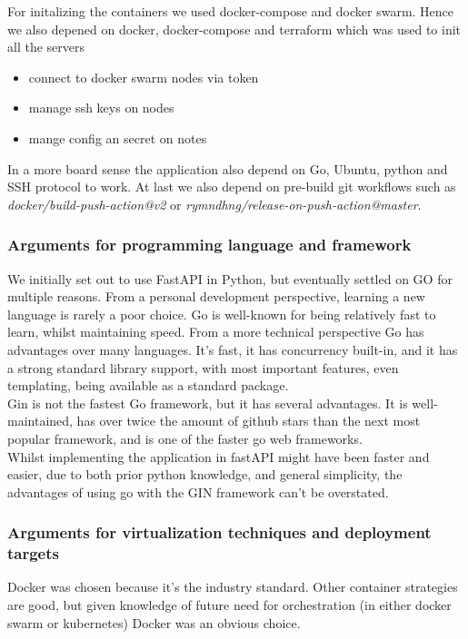 For initalizing the containers we used docker-compose and docker swarm. Hence we also depened on docker, docker-compose
and terraform which was used to init all the servers
\begin{itemize}
    \item connect to docker swarm nodes via token
    \item manage ssh keys on nodes 
    \item mange config an secret on notes
\end{itemize}

In a more board sense the application also depend on Go, Ubuntu, python and SSH protocol to work. At last we 
also depend on pre-build git workflows such as \textit{docker/build-push-action@v2} or \textit{rymndhng/release-on-push-action@master}.

\subsubsection{Arguments for programming language and framework}
We initially set out to use FastAPI in Python, but eventually settled on GO for multiple reasons. From a personal 
development perspective, learning a new language is rarely a poor choice. Go is well-known for being relatively 
fast to learn, whilst maintaining speed. From a more technical perspective Go has advantages over many languages. 
It's fast, it has concurrency built-in, and it has a strong standard library support, with most important features, 
even templating, being available as a standard package.\\

Gin is not the fastest Go framework, but it has several advantages. It is well-maintained, has over twice the 
amount of github stars than the next most popular framework, and is one of the faster go web frameworks.\\

Whilst implementing the application in fastAPI might have been faster and easier, due to both prior python 
knowledge, and general simplicity, the advantages of using go with the GIN framework can't be overstated. 

\subsubsection{Arguments for virtualization techniques and deployment targets}
Docker was chosen because it's the industry standard. Other container strategies are good, but given knowledge 
of future need for orchestration (in either docker swarm or kubernetes) Docker was an obvious choice.\\

